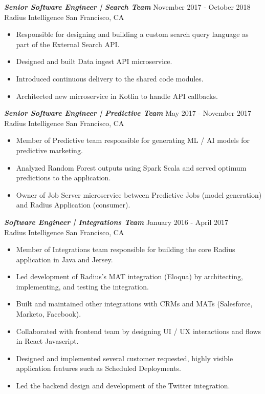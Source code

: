 \documentclass[overlapped, 10pt]{res} %
\begin{document}
\begin{resume}
{\sl \textbf{Senior Software Engineer | Search Team}} \hfill November 2017 - October 2018 \\
Radius Intelligence \hfill San Francisco, CA
\begin{itemize}
\item Responsible for designing and building a custom search query language as part of the External Search API.
\item Designed and built Data ingest API microservice.
\item Introduced continuous delivery to the shared code modules.
\item Architected new microservice in Kotlin to handle API callbacks.
\end{itemize} 

{\sl \textbf{Senior Software Engineer | Predictive Team}} \hfill May 2017 - November 2017 \\
Radius Intelligence \hfill San Francisco, CA
\begin{itemize}
\item Member of Predictive team responsible for generating ML / AI models for predictive marketing.
\item Analyzed Random Forest outputs using Spark Scala and served optimum predictions to the application.
\item Owner of Job Server microservice between Predictive Jobs (model generation) and Radius Application (consumer).
\end{itemize} 

{\sl \textbf{Software Engineer | Integrations Team}} \hfill January 2016 - April 2017 \\
Radius Intelligence \hfill San Francisco, CA
\begin{itemize} \itemsep -2pt %
\item Member of Integrations team responsible for building the core Radius application in Java and Jersey.
\item Led development of Radius’s MAT integration (Eloqua) by architecting, implementing, and testing the integration.
\item Built and maintained other integrations with CRMs and MATs (Salesforce, Marketo, Facebook).
\item Collaborated with frontend team by designing UI / UX interactions and flows in React Javascript.
\item Designed and implemented several customer requested, highly visible application features such as Scheduled Deployments.
\item Led the backend design and development of the Twitter integration.
\end{itemize}
 

\end{resume}
\end{document}
